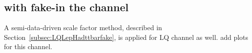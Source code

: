 \subsection{\ttbar with fake-\tauhad in the \hadhad channel}

A semi-data-driven scale factor method, described in Section~\ref{subsec:LQLepHadttbarfake}, is applied for LQ \hadhad channel as well. {\color{red} add plots for this channel}.
